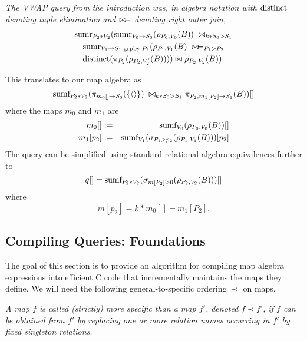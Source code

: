 \begin{example}\em
The VWAP query from the introduction was, in algebra notation with $\mbox{distinct}$
denoting
tuple elimination and $\bowtie\!=$ denoting right outer join,
\begin{multline*}
\mbox{sumr}_{P_2 * V_2}(\mbox{sumr}_{V_0 \rightarrow S_0}(\rho_{P_0, V_0}(B))
\; \bowtie_{k * S_0 > S_1} \\
\mbox{sumr}_{V_1 \rightarrow S_1 \;\mathrm{grpby}\; P_2}(
\rho_{P_1, V_1}(B) \; \bowtie\!=_{P_1 > P_2} \\
\mbox{distinct}(\pi_{P_2}(\rho_{P_2, V_2'}(B)))) \bowtie \rho_{P_2, V_2}(B)).
\end{multline*}

%
This translates to our map algebra as
\[
\mbox{sumf}_{P_2 * V_2}(
\pi_{m_0[]  \rightarrow S_0}(\{{\langle\rangle}\})
\; \bowtie_{k * S_0 > S_1}
\pi_{P_2, m_1[P_2] \rightarrow S_1}(B))[]
\]
%
where the maps $m_0$ and $m_1$ are
\begin{eqnarray*}
m_0[] &:=&
\mbox{sumf}_{V_0}(\rho_{P_0, V_0}(B))[]
\\
m_1[p_2] &:=&
\mbox{sumf}_{V_1}(\sigma_{P_1 > p_2}(\rho_{P_1, V_1}(B)))[p_2]
\end{eqnarray*}
The query can be simplified using standard relational algebra equivalences
further to
\begin{equation}
q[] = \mbox{sumf}_{P_2 * V_2}(
\sigma_{m[P_2] > 0}(\rho_{P_2, V_2}(B)))[]
\end{equation}
where
\[
m[p_2] = k * m_0[] - m_1[P_2].
\]
\punto
\end{example}



\subsection{Compiling Queries: Foundations}


The goal of this section is to provide an algorithm for compiling map algebra
expressions into efficient C code that incrementally maintains the
maps they define.
We will need the following general-to-specific ordering $\prec$ on maps.


\begin{definition}\em
A map $f$ is called (strictly) {\em more specific than}\/ a map $f'$,
denoted $f \prec f'$, if $f$ can be obtained from $f'$ by replacing
one or more relation names occurring in $f'$ by fixed singleton relations.
\end{definition}


